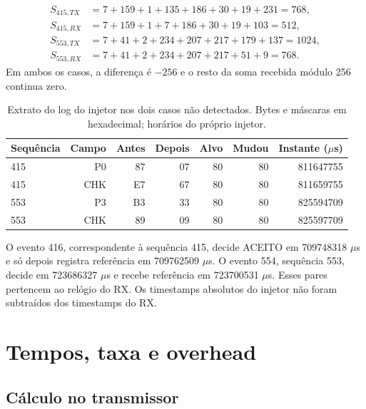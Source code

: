 \documentclass[12pt,a4paper]{article}
\begin{document}
\begin{align*}
S_{415,TX}&=7+159+1+135+186+30+19+231=768,\\
S_{415,RX}&=7+159+1+7+186+30+19+103=512,\\
S_{553,TX}&=7+41+2+234+207+217+179+137=1024,\\
S_{553,RX}&=7+41+2+234+207+217+51+9=768.
\end{align*}
Em ambos os casos, a diferença é $-256$ e o resto da soma recebida módulo 256 continua zero.\par

\begin{table}[htbp]\centering\small\caption{Extrato do log do injetor nos dois casos não detectados. Bytes e máscaras em hexadecimal; horários do próprio injetor.}\begin{tabular}{lrrrrrr}\toprule Sequência & Campo & Antes & Depois & Alvo & Mudou & Instante ($\mu$s)\\\midrule

415 & P0 & 87 & 07 & 80 & 80 & 811647755 \\

415 & CHK & E7 & 67 & 80 & 80 & 811659755 \\

553 & P3 & B3 & 33 & 80 & 80 & 825594709 \\

553 & CHK & 89 & 09 & 80 & 80 & 825597709 \\

\bottomrule\end{tabular}\label{tab:log-injetor}\end{table}

O evento 416, correspondente à sequência 415, decide ACEITO em 709748318 \ensuremath{\mu}s e só depois registra referência em 709762509 \ensuremath{\mu}s. O evento 554, sequência 553, decide em 723686327 \ensuremath{\mu}s e recebe referência em 723700531 \ensuremath{\mu}s. Esses pares pertencem ao relógio do RX. Os timestamps absolutos do injetor não foram subtraídos dos timestamps do RX.\par

\section{Tempos, taxa e overhead}

\subsection{Cálculo no transmissor}
\end{document}
